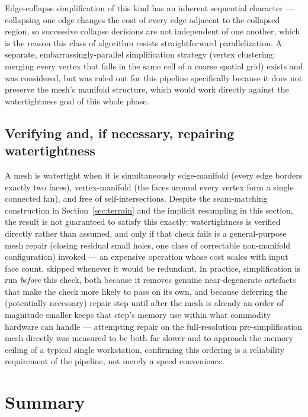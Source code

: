 \documentclass[11pt]{article}
\begin{document}
Edge-collapse simplification of this kind has an inherent sequential character --- collapsing
one edge changes the cost of every edge adjacent to the collapsed region, so successive
collapse decisions are not independent of one another, which is the reason this class of
algorithm resists straightforward parallelization. A separate, embarrassingly-parallel
simplification strategy (vertex clustering: merging every vertex that falls in the same cell
of a coarse spatial grid) exists and was considered, but was ruled out for this pipeline
specifically because it does not preserve the mesh's manifold structure, which would work
directly against the watertightness goal of this whole phase.

\subsection{Verifying and, if necessary, repairing watertightness}

A mesh is watertight when it is simultaneously edge-manifold (every edge borders exactly two
faces), vertex-manifold (the faces around every vertex form a single connected fan), and free
of self-intersections. Despite the seam-matching construction in Section~\ref{sec:terrain} and
the implicit resampling in this section, the result is not guaranteed to satisfy this exactly:
watertightness is verified directly rather than assumed, and only if that check fails is a
general-purpose mesh repair (closing residual small holes, one class of correctable
non-manifold configuration) invoked --- an expensive operation whose cost scales with input
face count, skipped whenever it would be redundant. In practice, simplification is run
\emph{before} this check, both because it removes genuine near-degenerate artefacts that make
the check more likely to pass on its own, and because deferring the (potentially necessary)
repair step until after the mesh is already an order of magnitude smaller keeps that step's
memory use within what commodity hardware can handle --- attempting repair on the
full-resolution pre-simplification mesh directly was measured to be both far slower and to
approach the memory ceiling of a typical single workstation, confirming this ordering is a
reliability requirement of the pipeline, not merely a speed convenience.

\section{Summary}
\end{document}
